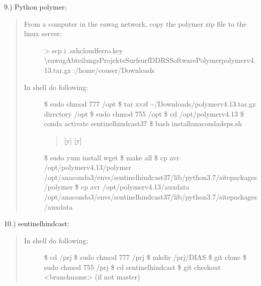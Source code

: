 \documentclass[letterpaper,10pt,english]{sphinxmanual}
\begin{document}
9.) Python \sphinxhyphen{} polymer: 
\begin{quote}
\begin{description}
\item[{From a computer in the eawag network, copy the polymer zip file to the linux server:}] \leavevmode
\textgreater{} scp \sphinxhyphen{}i .sshcloudferro.key \textbackslash{}eawagAbteilungs\sphinxhyphen{}ProjekteSurfsurf\sphinxhyphen{}DDRSSoftwarePolymerpolymer\sphinxhyphen{}v4.13.tar.gz :/home/eouser/Downloads

\item[{In shell do following:}] \leavevmode
\$ sudo chmod 777 /opt
\$ tar \sphinxhyphen{}xvzf \textasciitilde{}/Downloads/polymer\sphinxhyphen{}v4.13.tar.gz \textendash{}directory /opt
\$ sudo chmod 755 /opt
\$ cd /opt/polymer\sphinxhyphen{}v4.13
\$ conda activate sentinel\sphinxhyphen{}hindcast\sphinxhyphen{}37
\$ bash install\sphinxhyphen{}anaconda\sphinxhyphen{}deps.sh
\begin{quote}

{[}y{]}
{[}y{]}
\end{quote}

\$ sudo yum install wget
\$ make all
\$ cp \sphinxhyphen{}avr /opt/polymer\sphinxhyphen{}v4.13/polymer /opt/anaconda3/envs/sentinel\sphinxhyphen{}hindcast\sphinxhyphen{}37/lib/python3.7/site\sphinxhyphen{}packages/polymer
\$ cp \sphinxhyphen{}avr /opt/polymer\sphinxhyphen{}v4.13/auxdata /opt/anaconda3/envs/sentinel\sphinxhyphen{}hindcast\sphinxhyphen{}37/lib/python3.7/site\sphinxhyphen{}packages/auxdata

\end{description}
\end{quote}

10.) sentinel\sphinxhyphen{}hindcast: 
\begin{quote}
\begin{description}
\item[{In shell do following:}] \leavevmode
\$ cd /prj
\$ sudo chmod 777 /prj
\$ mkdir /prj/DIAS
\$ git clone 
\$ sudo chmod 755 /prj
\$ cd sentinel\sphinxhyphen{}hindcast
\$ git checkout \textless{}branchname\textgreater{} (if not master)

\end{description}
\end{quote}
\end{document}
